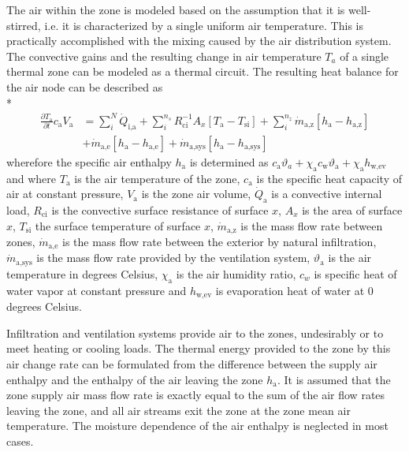 The air within the zone is modeled based on the assumption that it is well-stirred, i.e. it is characterized by a single uniform air temperature. This is practically accomplished with the mixing caused by the air distribution system. The convective gains and the resulting change in air temperature $T_{a}$ of a single thermal zone can be modeled as a thermal circuit. The resulting heat balance for the air node can be described as \\*
\begin{equation}
\begin{split}
\frac{\partial T_{\textrm{a}}}{\partial t} c_{\textrm{a}} V_{\textrm{a}} & = \sum_{i}^{N} \dot{Q}_{\textrm{i,a}} + \sum_{i}^{n_{s}}R_{\textrm{ci}}^{-1}A_{x}\left[T_{\textrm{a}}-T_{\textrm{si}}\right] +\sum_{i}^{n_{z}}\dot{m}_{\textrm{a,z}}\left[h_{\textrm{a}}-h_{\textrm{a,z}}\right]  \\ & +\dot{m}_{\textrm{a,e}}\left[h_{\textrm{a}}-h_{\textrm{a,e}}\right] +\dot{m}_{\textrm{a,sys}}\left[h_{\textrm{a}}-h_{\textrm{a,sys}}\right]
\end{split}
\end{equation}
wherefore the specific air enthalpy $h_{\textrm{a}}$ is determined as $c_{\textrm{a}}\vartheta_{a}+\chi_{\textrm{a}} c_{\textrm{w}}\vartheta_{\textrm{a}} + \chi_{\textrm{a}} h_{\textrm{w,ev}}$ and where $T_{\textrm{a}}$ is the air temperature of the zone, $c_{\textrm{a}}$ is the specific heat capacity of air at constant pressure, $V_{\textrm{a}}$ is the zone air volume, $\dot{Q}_{\textrm{a}}$ is a convective internal load, $R_{\textrm{ci}}$ is the convective surface resistance of surface $x$, $A_{x}$ is the area of surface $x$, $T_{\textrm{si}}$ the surface temperature of surface $x$, $\dot{m}_{\textrm{a,z}}$ is the mass flow rate between zones, $\dot{m}_{\textrm{a,e}}$ is the mass flow rate between the exterior by natural infiltration, $\dot{m}_{\textrm{a,sys}}$ is the mass flow rate provided by the ventilation system, $\vartheta_{\textrm{a}}$ is the air temperature in degrees Celsius, $\chi_{\textrm{a}}$ is the air humidity ratio, $c_{w}$ is specific heat of water vapor at constant pressure and $h_{\textrm{w,ev}}$ is evaporation heat of water at 0 degrees Celsius. 

Infiltration and ventilation systems provide air to the zones, undesirably or to meet heating or cooling loads. The thermal energy provided to the zone by this air change rate can be formulated from the difference between the supply air enthalpy and the enthalpy of the air leaving the zone $h_{\textrm{a}}$. It is assumed that the zone supply air mass flow rate is exactly equal to the sum of the air flow rates leaving the zone, and all air streams exit the zone at the zone mean air temperature. The moisture dependence of the air enthalpy is neglected in most cases.

